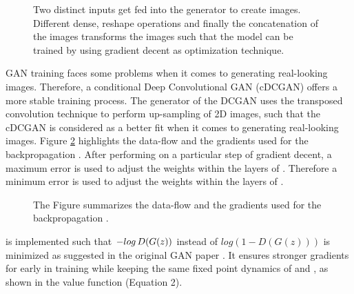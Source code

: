 \documentclass[journal]{IEEEtran}
\begin{document}
{{\begin{figure}[htp]
	\centering
	\caption{
		Two distinct inputs get fed into the generator to create images. Different dense, reshape operations and finally the concatenation of the images transforms the images such that the model can be trained by using gradient decent as optimization technique.
	}
	\label{fig:cdcgan-forward-step}
\end{figure}

GAN training faces some problems when it comes to generating real-looking images. Therefore, a conditional Deep Convolutional GAN (cDCGAN) offers a more stable training process. The generator of the DCGAN uses the transposed convolution technique to perform up-sampling of 2D images, such that the cDCGAN is considered as a better fit when it comes to generating real-looking images. Figure \ref{fig:cdcgan-backward-step} highlights the data-flow and the gradients used for the backpropagation \cite{goodfellow_generative_2014}.  After performing on a particular step of gradient decent, a maximum error is used to adjust the weights within the layers of . Therefore a minimum error is used to adjust the weights within the layers of . 

\begin{figure}[htp]
	\centering
	\caption{
		The Figure summarizes the data-flow and the gradients used for the backpropagation \cite{goodfellow_generative_2014}. 
	}
	\label{fig:cdcgan-backward-step}
\end{figure}


 is implemented such that \(-log \thinspace D(G(z))\) instead of \(log(1 - D(G(z)))\) is minimized as suggested in the original GAN paper \cite{goodfellow_generative_2014}. It ensures stronger gradients for  early in training while keeping the same fixed point dynamics of  and , as shown in the value function (Equation 2).

}}
\end{document}

